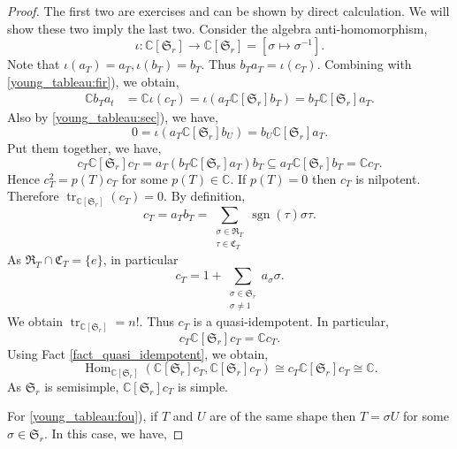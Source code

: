 \documentclass{article}
\numberwithin{equation}{theorem}
\DeclareMathOperator{\tr}{tr}
\DeclareMathOperator{\Hom}{Hom}
\DeclareMathOperator{\sgn}{sgn}
\newcommand{\C}[0]{\mathbb{C}}
\newcommand{\fS}[0]{\mathfrak{S}}
\newcommand{\fR}[0]{\mathfrak{R}}
\newcommand{\fC}[0]{\mathfrak{C}}
\begin{document}
\begin{proof}
    The first two are exercises and can be shown by direct calculation. We will show these two imply the last two. Consider the algebra anti-homomorphism,
    \begin{equation*}
        \iota:\C[\fS_r]\to\C[\fS_r] = [\sigma\mapsto \sigma^{-1}].
    \end{equation*}
    Note that $\iota(a_T)=a_T,\iota(b_T) = b_T$. Thus $b_Ta_T = \iota(c_T)$. Combining with \ref{young_tableau:fir}), we obtain,
    \begin{align*}
        \C b_Ta_t & = \C\iota(c_T) = \iota(a_T\C[\fS_r]b_T)=b_T\C[\fS_r]a_T.
    \end{align*}
    Also by \ref{young_tableau:sec}), we have,
    \begin{equation*}
        0 = \iota(a_T\C[\fS_r]b_U) = b_U\C[\fS_r]a_T.
    \end{equation*}
    Put them together, we have,
    \begin{equation*}
        c_T\C[\fS_r]c_T = a_T(b_T\C[\fS_r]a_T)b_T \subseteq a_T\C[\fS_r] b_T = \C c_T.
    \end{equation*}
    Hence $c_T^2 = p(T) c_T$ for some $p(T)\in\C$. If $p(T)=0$ then $c_T$ is nilpotent. Therefore $\tr_{\C[\fS_r]}(c_T)=0$. By definition,
    \begin{equation*}
        c_T=a_Tb_T = \sum_{\substack{\sigma\in\fR_T\\\tau\in\fC_T}}\sgn(\tau)\sigma\tau.
    \end{equation*}
    As $\fR_T\cap\fC_T=\{e\}$, in particular 
    \begin{equation*}
        c_T = 1+\sum_{\substack{\sigma\in\fS_r\\ \sigma\not=1}}a_\sigma\sigma.
    \end{equation*}
    We obtain $\tr_{\C[\fS_r]} = n!$. Thus $c_T$ is a quasi-idempotent. In particular,
    \begin{equation*}
        c_T\C[\fS_r]c_T = \C c_T.
    \end{equation*}
    Using Fact \ref{fact_quasi_idempotent}, we obtain,
    \begin{equation*}
        \Hom_{\C[\fS_r]}(\C[\fS_r]c_T,\C[\fS_r]c_T) \cong c_T\C[\fS_r]c_T \cong \C.
    \end{equation*}
    As $\fS_r$ is semisimple, $\C[\fS_r]c_T$ is simple. 
    \par For \ref{young_tableau:fou}), if $T$ and $U$ are of the same shape then $T=\sigma U$ for some $\sigma\in\fS_r$. In this case, we have,

\end{proof}
\end{document}
